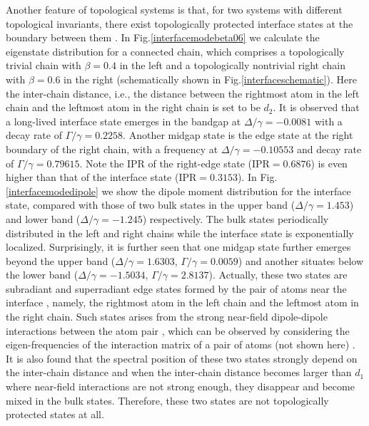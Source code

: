 \documentclass[aps,pra,reprint,groupedaddress,nofootinbib,longbibliography,showpacs]{revtex4-1}
\begin{document}
Another feature of topological systems is that, for two systems with different topological invariants, there exist topologically protected interface states at the boundary between them \cite{ozawa2018topological}. In Fig.\ref{interfacemodebeta06} we calculate the eigenstate distribution for a connected chain, which comprises a topologically trivial chain with $\beta=0.4$ in the left and a topologically nontrivial right chain with $\beta=0.6$ in the right (schematically shown in Fig.\ref{interfaceschematic}). Here the inter-chain distance, i.e., the distance between the rightmost atom in the left chain and the leftmost atom in the right chain is set to be $d_2$. It is observed that a long-lived interface state emerges in the bandgap at $\Delta/\gamma=-0.0081$ with a decay rate of $\Gamma/\gamma=0.2258$. Another midgap state is the edge state at the right boundary of the right chain, with a frequency at $\Delta/\gamma=-0.10553$ and decay rate of $\Gamma/\gamma=0.79615$. Note the IPR of the right-edge state ($\mathrm{IPR}=0.6876$) is even higher than that of the interface state ($\mathrm{IPR}=0.3153$). In Fig.\ref{interfacemodedipole} we show the dipole moment distribution for the interface state, compared with those of two bulk states in the upper band ($\Delta/\gamma=1.453$) and lower band ($\Delta/\gamma=-1.245$) respectively. The bulk states periodically distributed in the left and right chains while the interface state is exponentially localized. Surprisingly, it is further seen that one midgap state further emerges beyond the upper band ($\Delta/\gamma=1.6303$, $\Gamma/\gamma=0.0059$) and another situates below the lower band ($\Delta/\gamma=-1.5034$, $\Gamma/\gamma=2.8137$). Actually, these two states are subradiant and superradiant edge states formed by the pair of atoms near the interface \cite{Schilder2016,guerin2017light}, namely, the rightmost atom in the left chain and the leftmost atom in the right chain. Such states arises from the strong near-field dipole-dipole interactions between the atom pair \cite{Schilder2016,guerin2017light}, which can be observed by considering the eigen-frequencies of the interaction matrix of a pair of atoms (not shown here) \cite{Skipetrov2014}. It is also found that the spectral position of these two states strongly depend on the inter-chain distance and when the inter-chain distance becomes larger than $d_1$ where near-field interactions are not strong enough, they disappear and become mixed in the bulk states. Therefore, these two states are not topologically protected states at all.
\end{document}
